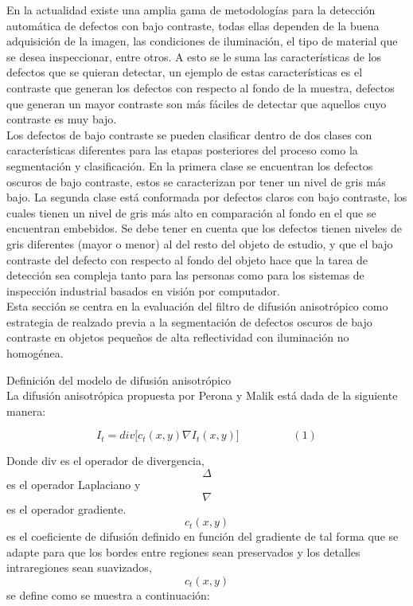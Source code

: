 En la actualidad existe una  amplia gama de metodologías para la detección automática de defectos  con  bajo contraste, todas ellas dependen de la buena adquisici\'on de la imagen, las condiciones de iluminaci\'on, el tipo de material que se desea inspeccionar, entre otros. A esto se le suma las características de los defectos que se quieran detectar, un ejemplo de estas características es el contraste que generan los defectos con respecto al fondo de la muestra, defectos que generan un mayor contraste son más fáciles de detectar que aquellos cuyo 
contraste es muy bajo.\\
Los defectos de bajo contraste se pueden clasificar dentro de dos clases con características diferentes para las etapas posteriores del proceso como la segmentación y clasificación. En la primera clase se encuentran los defectos oscuros de bajo contraste, estos se caracterizan por tener un nivel de gris más bajo. La segunda clase está conformada por defectos claros con bajo contraste, los cuales tienen un nivel de gris más alto 
en comparación al fondo en el que se encuentran embebidos. Se debe tener en cuenta que los defectos tienen niveles de gris diferentes (mayor o menor) al del resto del objeto de estudio, y  que el bajo contraste del defecto con respecto al  fondo del objeto  hace que la tarea de detección sea compleja tanto para las personas como para los sistemas de inspección industrial basados en visión por computador.\\

Esta secci\'on se centra en la evaluaci\'on del filtro de difusión anisotrópico como estrategia de realzado previa a la segmentación de defectos oscuros de bajo contraste en objetos pequeños de alta reflectividad con iluminación no homogénea.

Definici\'on del modelo de difusi\'on anisotr\'opico\\

La difusión anisotrópica propuesta por Perona y Malik \cite{perona1990scale} está dada de la siguiente manera: 

\begin{displaymath}
I_t=div\lbrack c_t(x,y)\nabla I_t(x,y)\rbrack  \hspace{2cm}(1)
\end{displaymath}

Donde div  es el operador de divergencia, \begin{displaymath}  \Delta \end{displaymath} es el operador Laplaciano y \begin{displaymath}
\nabla \end{displaymath}   es el operador gradiente.  \begin{displaymath} c_t(x,y)\end{displaymath} es el coeficiente 
de difusión definido en función del gradiente de tal forma que se adapte para que los bordes entre regiones sean preservados 
y los detalles intraregiones sean suavizados, \begin{displaymath} c_t(x,y)\end{displaymath} se define como se muestra a continuación:

